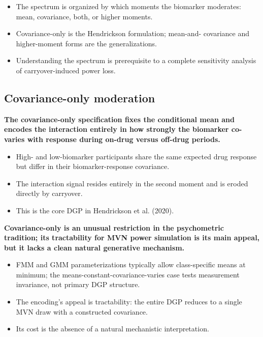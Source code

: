 \documentclass[
  11pt,
]{article}
\begin{document}
\begin{itemize}\setlength{\itemsep}{2pt}\setlength{\parskip}{0pt}
\item The spectrum is organized by which moments the biomarker
  moderates: mean, covariance, both, or higher moments.
\item Covariance-only is the Hendrickson formulation; mean-and-
  covariance and higher-moment forms are the generalizations.
\item Understanding the spectrum is prerequisite to a complete
  sensitivity analysis of carryover-induced power loss.
\end{itemize}

\subsection{Covariance-only moderation}\label{covariance-only-moderation}

\textbf{The covariance-only specification fixes the conditional mean
and encodes the interaction entirely in how strongly the biomarker
co-varies with response during on-drug versus off-drug periods.}

\begin{itemize}\setlength{\itemsep}{2pt}\setlength{\parskip}{0pt}
\item High- and low-biomarker participants share the same expected
  drug response but differ in their biomarker-response covariance.
\item The interaction signal resides entirely in the second moment
  and is eroded directly by carryover.
\item This is the core DGP in Hendrickson et al. (2020).
\end{itemize}

\textbf{Covariance-only is an unusual restriction in the psychometric
tradition; its tractability for MVN power simulation is its main
appeal, but it lacks a clean natural generative mechanism.}

\begin{itemize}\setlength{\itemsep}{2pt}\setlength{\parskip}{0pt}
\item FMM and GMM parameterizations typically allow class-specific
  means at minimum; the means-constant-covariance-varies case tests
  measurement invariance, not primary DGP structure.
\item The encoding's appeal is tractability: the entire DGP reduces
  to a single MVN draw with a constructed covariance.
\item Its cost is the absence of a natural mechanistic
  interpretation.
\end{itemize}
\end{document}
